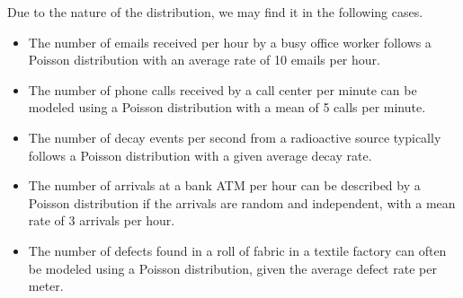 Due to the nature of the distribution, we may find it in the following cases.
\begin{itemize}
    \item The number of emails received per hour by a busy office worker follows a Poisson distribution with an average rate of 10 emails per hour.
    \item The number of phone calls received by a call center per minute can be modeled using a Poisson distribution with a mean of 5 calls per minute.
    \item The number of decay events per second from a radioactive source typically follows a Poisson distribution with a given average decay rate.
    \item The number of arrivals at a bank ATM per hour can be described by a Poisson distribution if the arrivals are random and independent, with a mean rate of 3 arrivals per hour.
    \item The number of defects found in a roll of fabric in a textile factory can often be modeled using a Poisson distribution, given the average defect rate per meter.
\end{itemize}

